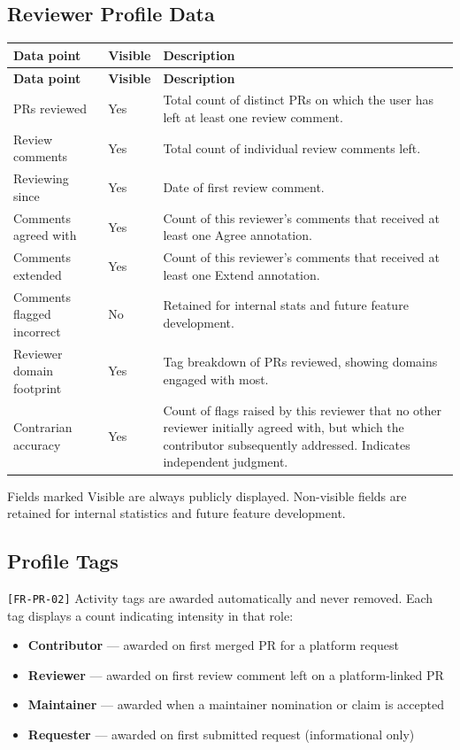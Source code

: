 \documentclass[12pt,a4paper]{article}
\begin{document}
\subsection{Reviewer Profile Data}
\begin{longtable}{L{4cm} L{1.8cm} L{7.5cm}}
  \color{white}\bfseries Data point & \color{white}\bfseries Visible & \color{white}\bfseries Description \\
  \endfirsthead
  \color{white}\bfseries Data point & \color{white}\bfseries Visible & \color{white}\bfseries Description \\
  \endhead\hline
  PRs reviewed              & Yes & Total count of distinct PRs on which the user has left at least one review comment. \\
  Review comments           & Yes & Total count of individual review comments left. \\
  Reviewing since           & Yes & Date of first review comment. \\
  Comments agreed with      & Yes & Count of this reviewer's comments that received at least one Agree annotation. \\
  Comments extended         & Yes & Count of this reviewer's comments that received at least one Extend annotation. \\
  Comments flagged incorrect & No & Retained for internal stats and future feature development. \\
  Reviewer domain footprint & Yes & Tag breakdown of PRs reviewed, showing domains engaged with most. \\
  Contrarian accuracy       & Yes & Count of flags raised by this reviewer that no other reviewer initially agreed with, but which the contributor subsequently addressed. Indicates independent judgment. \\
  \hline
\end{longtable}

\begin{infobox}
Fields marked Visible are always publicly displayed. Non-visible fields are retained for internal statistics and future feature development.
\end{infobox}

\subsection{Profile Tags}
\texttt{[FR-PR-02]} Activity tags are awarded automatically and never removed. Each tag displays a count indicating intensity in that role:
\begin{itemize}
  \item \textbf{Contributor} --- awarded on first merged PR for a platform request
  \item \textbf{Reviewer} --- awarded on first review comment left on a platform-linked PR
  \item \textbf{Maintainer} --- awarded when a maintainer nomination or claim is accepted
  \item \textbf{Requester} --- awarded on first submitted request (informational only)
\end{itemize}
\end{document}
